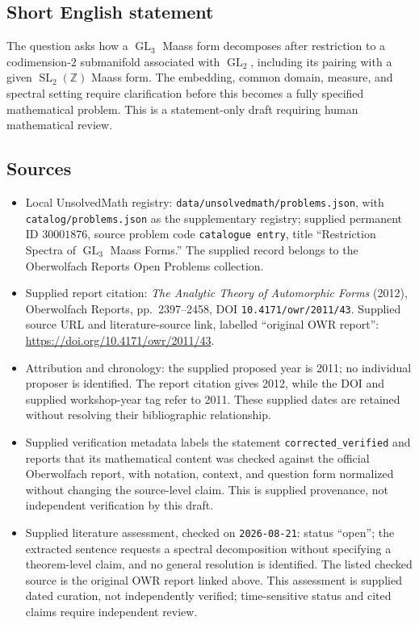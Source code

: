 \documentclass[11pt]{article}
\newcommand{\Z}{\mathbb{Z}}
\begin{document}
\subsection{Short English statement}
The question asks how a \(\operatorname{GL}_3\) Maass form decomposes after restriction to a codimension-\(2\) submanifold associated with \(\operatorname{GL}_2\), including its pairing with a given \(\operatorname{SL}_2(\Z)\) Maass form. The embedding, common domain, measure, and spectral setting require clarification before this becomes a fully specified mathematical problem. This is a statement-only draft requiring human mathematical review.
\subsection{Sources}
\begin{itemize}
\item Local UnsolvedMath registry: \texttt{data/unsolvedmath/problems.json}, with \texttt{catalog/problems.json} as the supplementary registry; supplied permanent ID \(30001876\), source problem code \texttt{catalogue entry}, title ``Restriction Spectra of \(\operatorname{GL}_3\) Maass Forms.'' The supplied record belongs to the Oberwolfach Reports Open Problems collection.
\item Supplied report citation: \emph{The Analytic Theory of Automorphic Forms} (2012), Oberwolfach Reports, pp.~2397--2458, DOI \texttt{10.4171/owr/2011/43}. Supplied source URL and literature-source link, labelled ``original OWR report'': \url{https://doi.org/10.4171/owr/2011/43}.
\item Attribution and chronology: the supplied proposed year is 2011; no individual proposer is identified. The report citation gives 2012, while the DOI and supplied workshop-year tag refer to 2011. These supplied dates are retained without resolving their bibliographic relationship.
\item Supplied verification metadata labels the statement \texttt{corrected\_verified} and reports that its mathematical content was checked against the official Oberwolfach report, with notation, context, and question form normalized without changing the source-level claim. This is supplied provenance, not independent verification by this draft.
\item Supplied literature assessment, checked on \texttt{2026-08-21}: status ``open''; the extracted sentence requests a spectral decomposition without specifying a theorem-level claim, and no general resolution is identified. The listed checked source is the original OWR report linked above. This assessment is supplied dated curation, not independently verified; time-sensitive status and cited claims require independent review.
\end{itemize}
\end{document}
